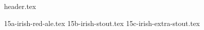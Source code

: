 \clearpage
{}
\divisorLine
{header.tex}
\begin{multicols*}{2}
{15a-irish-red-ale.tex}
{15b-irish-stout.tex}
{15c-irish-extra-stout.tex}
\end{multicols*}